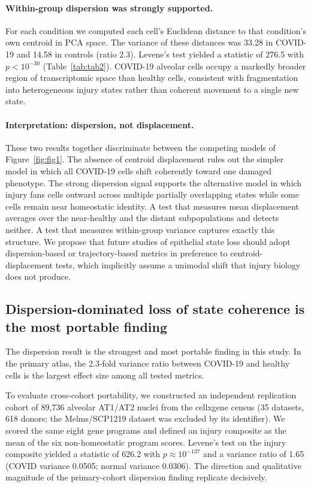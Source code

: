 \documentclass[11pt]{article}
\begin{document}
\paragraph{Within-group dispersion was strongly supported.} For each condition we computed each cell's Euclidean distance to that condition's own centroid in PCA space. The variance of these distances was 33.28 in COVID-19 and 14.58 in controls (ratio 2.3). Levene's test yielded a statistic of 276.5 with $p < 10^{-30}$ (Table~\ref{tab:tab2}). COVID-19 alveolar cells occupy a markedly broader region of transcriptomic space than healthy cells, consistent with fragmentation into heterogeneous injury states rather than coherent movement to a single new state.

\paragraph{Interpretation: dispersion, not displacement.} These two results together discriminate between the competing models of Figure~\ref{fig:fig1}. The absence of centroid displacement rules out the simpler model in which all COVID-19 cells shift coherently toward one damaged phenotype. The strong dispersion signal supports the alternative model in which injury fans cells outward across multiple partially overlapping states while some cells remain near homeostatic identity. A test that measures mean displacement averages over the near-healthy and the distant subpopulations and detects neither. A test that measures within-group variance captures exactly this structure. We propose that future studies of epithelial state loss should adopt dispersion-based or trajectory-based metrics in preference to centroid-displacement tests, which implicitly assume a unimodal shift that injury biology does not produce.

\subsection{Dispersion-dominated loss of state coherence is the most portable finding}\label{sec:dispersion}

The dispersion result is the strongest and most portable finding in this study. In the primary atlas, the 2.3-fold variance ratio between COVID-19 and healthy cells is the largest effect size among all tested metrics.

To evaluate cross-cohort portability, we constructed an independent replication cohort of 89{,}736 alveolar AT1/AT2 nuclei from the cellxgene census (35 datasets, 618 donors; the Melms/SCP1219 dataset was excluded by its identifier). We scored the same eight gene programs and defined an injury composite as the mean of the six non-homeostatic program scores. Levene's test on the injury composite yielded a statistic of 626.2 with $p \approx 10^{-137}$ and a variance ratio of 1.65 (COVID variance 0.0505; normal variance 0.0306). The direction and qualitative magnitude of the primary-cohort dispersion finding replicate decisively.
\end{document}
